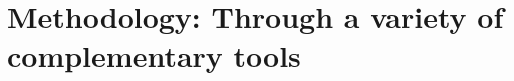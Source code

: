 \documentclass[a4paper,twoside,10pt,final]{memoir} %
\begin{document}
\chapter{Methodology: Through a variety of complementary tools}
\label{chap:chap_methodo}

\clearpage



%

%


%
%
%


%
\end{document}
